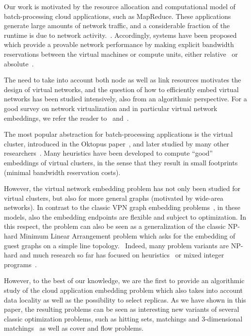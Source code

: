 \documentclass[9pt,twocolumn]{scrartcl}
\begin{document}
Our work is motivated by the resource allocation and computational model of
batch-processing cloud applications, such as MapReduce.
These applications
generate large amounts of network traffic, and a considerable
fraction of the runtime is due to network acti\-vi\-ty.~\cite{talk-about,amazonbw,orchestra}.
Accordingly, systems have been proposed which provide
a provable network performance by making explicit bandwidth reservations
between the virtual machines or compute units, either relative~\cite{seawall,faircloud,elasticswitch}
or absolute~\cite{secondnet,oktopus, proteus, drl, gatekeeper}.

The need to take into account both node as well as link resources motivates
the design of virtual networks, and the question of how to efficiently embed virtual networks
has been studied intensively, also from an algorithmic perspective.
For a good survey on network virtualization and in particular virtual network embeddings,
we refer the reader to~\cite{boutaba-survey} and~\cite{fischer-survey}.

The most popular abstraction for batch-processing applications is the virtual cluster,
introduced in the Oktopus paper~\cite{oktopus}, and later studied by many other researchers~\cite{proteus}.
Many heuristics have been developed to compute ``good'' embeddings of virtual clusters, in the sense that
they result in small footprints (minimal bandwidth reservation costs).

However, the virtual network embedding problem has not only been studied for virtual clusters,
but also for more general graphs (motivated by wide-area networks). In contrast to the classic VPN
graph embedding problems~\cite{gupta2001provisioning,Goyal2008},
in these models, also the embedding endpoints are flexible and subject to optimization.
In this respect, the problem can also be seen as a generalization of the classic NP-hard Minimum Linear Arrangement problem which asks for the
embedding of guest graphs on a simple line topology.~\cite{mla,mla-survey,mla-feige}
Indeed, many problem variants are NP-hard and much research so far has focused on heuristics~\cite{ammar,zhu06,simannealing,turner}
or mixed integer programs~\cite{infocom2009,ucc12mip}.

However, to the best of our knowledge, we are the first to provide an algorithmic
study of the cloud application embedding problem which also takes into account
data locality as well as the possibility to select replicas. As we have shown in this paper,
the resulting problems can be seen as interesting new variants of several classic optimization
problems, such as hitting sets, matchings and 3-dimensional matchings~\cite{3SC-hard} as well as cover and flow problems.~\cite{korte2002combinatorial}
\end{document}
